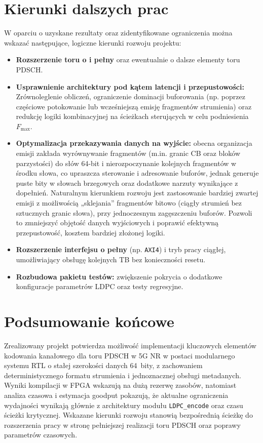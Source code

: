 \section*{Kierunki dalszych prac}
W oparciu o uzyskane rezultaty oraz zidentyfikowane ograniczenia można wskazać następujące, logiczne kierunki rozwoju projektu:

\begin{itemize}
  \item \textbf{Rozszerzenie toru o  i pełny } oraz ewentualnie o dalsze elementy toru PDSCH. 

  \item \textbf{Usprawnienie architektury pod kątem latencji i przepustowości:} Zrównoleglenie obliczeń, ograniczenie dominacji buforowania (np. poprzez częściowe potokowanie lub wcześniejszą emisję fragmentów strumienia) oraz redukcję logiki kombinacyjnej na ścieżkach sterujących w celu podniesienia $F_{\max}$. 

  \item \textbf{Optymalizacja przekazywania danych na wyjście:}
  obecna organizacja emisji zakłada wyrównywanie fragmentów (m.in. granic CB oraz bloków parzystości) do słów 64-bit
  i nierozpoczynanie kolejnych fragmentów w środku słowa, co upraszcza sterowanie i adresowanie buforów,
  jednak generuje puste bity w słowach brzegowych oraz dodatkowe narzuty wynikające z dopełnień.
  Naturalnym kierunkiem rozwoju jest zastosowanie bardziej zwartej emisji z możliwością „sklejania” fragmentów
  bitowo (ciągły strumień bez sztucznych granic słowa), przy jednoczesnym zagęszczeniu buforów.
  Pozwoli to zmniejszyć objętość danych wyjściowych i poprawić efektywną przepustowość,
  kosztem bardziej złożonej logiki.



  \item \textbf{Rozszerzenie interfejsu o pełny } (np. \texttt{AXI4}) i tryb pracy ciągłej, umożliwiający obsługę kolejnych TB bez konieczności resetu. 

  \item \textbf{Rozbudowa pakietu testów:} zwiększenie pokrycia o dodatkowe konfiguracje parametrów LDPC oraz testy regresyjne.
\end{itemize}

\section*{Podsumowanie końcowe}
Zrealizowany projekt potwierdza możliwość implementacji kluczowych elementów kodowania kanałowego dla toru PDSCH w 5G NR w postaci modularnego systemu RTL o stałej szerokości danych 64~bity, z zachowaniem deterministycznego formatu strumienia i jednoznacznej obsługi metadanych. Wyniki kompilacji w FPGA wskazują na dużą rezerwę zasobów, natomiast analiza czasowa i estymacja goodput pokazują, że aktualne ograniczenia wydajności wynikają głównie z architektury modułu \texttt{LDPC\_encode} oraz czasu ścieżki krytycznej. Wskazane kierunki rozwoju stanowią bezpośrednią ścieżkę do rozszerzenia pracy w stronę pełniejszej realizacji toru PDSCH oraz poprawy parametrów czasowych. 
